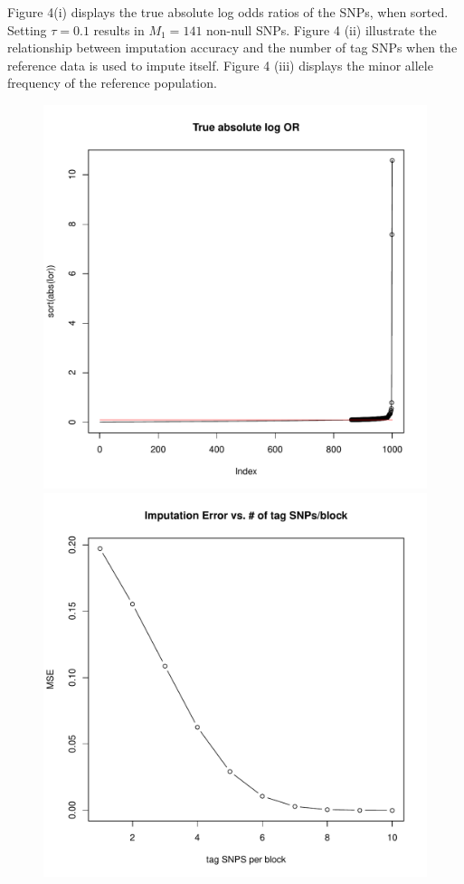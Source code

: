 \documentclass[12pt]{article}
\begin{document}
Figure 4(i) displays the true absolute log odds ratios of the SNPs,
when sorted.  Setting $\tau=0.1$ results in $M_1=141$ non-null SNPs.
Figure 4 (ii) illustrate the relationship between imputation accuracy
and the number of tag SNPs when the reference data is used to impute
itself.
Figure 4 (iii) displays the minor allele frequency of the reference population.


\begin{figure}[h]
\centering
\includegraphics[scale=0.25]{impute_g1.pdf}
\includegraphics[scale=0.25]{impute_g2.pdf}

\end{figure}
\end{document}
